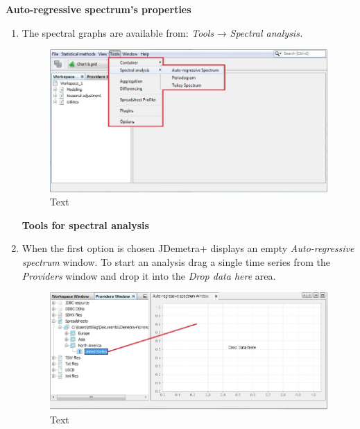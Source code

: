 \documentclass[
  letterpaper,
  DIV=11,
  numbers=noendperiod]{scrreprt}
\begin{document}
\textbf{Auto-regressive spectrum's properties}

\begin{enumerate}
\def\labelenumi{\arabic{enumi}.}
\item
  The spectral graphs are available from: \emph{Tools} → \emph{Spectral
  analysis.}

  \begin{figure}

  {\centering \includegraphics{./All_images/image1_342.jpeg}

  }

  \caption{Text}

  \end{figure}

  \textbf{Tools for spectral analysis}
\item
  When the first option is chosen JDemetra+ displays an empty
  \emph{Auto-regressive spectrum} window. To start an analysis drag a
  single time series from the \emph{Providers} window and drop it into
  the \emph{Drop data here} area.

  \begin{figure}

  {\centering \includegraphics{./All_images/image2_342.jpeg}

  }

  \caption{Text}


\end{figure}
\end{enumerate}
\end{document}
